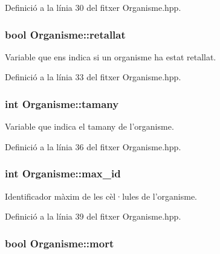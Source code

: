 Definició a la línia 30 del fitxer Organisme.\-hpp.

\hypertarget{class_organisme_acf912225a83570cb68542dcc6709023a}{
\subsubsection[{retallat}]{\setlength{\rightskip}{0pt plus 5cm}bool Organisme\-::retallat\hspace{0.3cm}{\ttfamily [private]}}}\label{class_organisme_acf912225a83570cb68542dcc6709023a}


Variable que ens indica si un organisme ha estat retallat. 



Definició a la línia 33 del fitxer Organisme.\-hpp.

\hypertarget{class_organisme_a5d30992b5ded1a9314aff94ce9fb3932}{
\subsubsection[{tamany}]{\setlength{\rightskip}{0pt plus 5cm}int Organisme\-::tamany\hspace{0.3cm}{\ttfamily [private]}}}\label{class_organisme_a5d30992b5ded1a9314aff94ce9fb3932}


Variable que indica el tamany de l'organisme. 



Definició a la línia 36 del fitxer Organisme.\-hpp.

\hypertarget{class_organisme_ae7f51a74f01cee155cf88a5b01545f78}{
\subsubsection[{max\-\_\-id}]{\setlength{\rightskip}{0pt plus 5cm}int Organisme\-::max\-\_\-id\hspace{0.3cm}{\ttfamily [private]}}}\label{class_organisme_ae7f51a74f01cee155cf88a5b01545f78}


Identificador màxim de les cèl·lules de l'organisme. 



Definició a la línia 39 del fitxer Organisme.\-hpp.

\hypertarget{class_organisme_ae20564db8d9ba5b7547750375010ed7b}{
\subsubsection[{mort}]{\setlength{\rightskip}{0pt plus 5cm}bool Organisme\-::mort\hspace{0.3cm}{\ttfamily [private]}}}\label{class_organisme_ae20564db8d9ba5b7547750375010ed7b}


